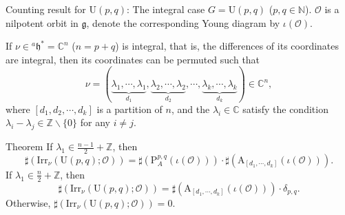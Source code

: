 \documentclass[fleqn,xcolor=dvipsnames]{beamer}
\newcommand{\BC}{{\mathbb {C}}}
\newcommand{\BN}{{\mathbb {N}}}
\newcommand{\BZ}{{\mathbb {Z}}}
\newcommand{\CO}{{\mathcal {O}}}
\newcommand{\fg}{\mathfrak{g}}
\newcommand{\fh}{\mathfrak{h}}
\newcommand{\U}{{\mathrm{U}}}
\newcommand{\Irr}{{\mathrm{Irr}}}
\begin{document}
\begin{frame}{Counting result for $\U(p,q)$: The integral case}
  $G = \U(p,q)$ ($p, q \in \BN$). $\CO$ is a nilpotent orbit in $\fg$, denote the corresponding Young diagram by $\iota(\CO)$.\par
  If $\nu \in {^a\fh^*} = \BC^n$ ($n = p+q$) is integral, that is, the differences of its coordinates are integral, then its coordinates can be permuted such that 
  \[ 
    \nu =  (\underbrace{\lambda_1, \cdots, \lambda_1}_{d_1}, \underbrace{\lambda_2, \cdots, \lambda_2}_{d_2}, \cdots, \underbrace{\lambda_k, \cdots, \lambda_k}_{d_k} ) \in \BC^n, 
  \]
  where $[d_1, d_2, \cdots, d_k]$ is a partition of $n$, and the $\lambda_i \in \BC$ satisfy the condition $\lambda_i - \lambda_j \in \BZ \backslash \{0\}$ for any $i \neq j$.
 
\end{frame}





\begin{frame}
   \begin{block}{Theorem}
        If $\lambda_1 \in \frac{n-1}{2} + \BZ$, then
        \begin{equation*}
            \sharp(\Irr_{\nu}(\U(p,q);\CO)) = \sharp\left(\mathrm{P}_{A}^{p,q}(\iota(\CO))\right) \cdot \sharp\left(\mathrm{A}_{[d_1,\cdots,d_k]}(\iota(\CO))\right).
        \end{equation*}
        If $\lambda_1 \in \frac{n}{2} + \BZ$, then
        \begin{equation*}
            \sharp(\Irr_{\nu}(\U(p,q);\CO)) = \sharp\left(\mathrm{A}_{[d_1,\cdots,d_k]}(\iota(\CO))\right) \cdot \delta_{p,q}.
        \end{equation*}
        Otherwise, $\sharp(\Irr_{\nu}(\U(p,q);\CO)) = 0$.
  \end{block}
\end{frame}
\end{document}
